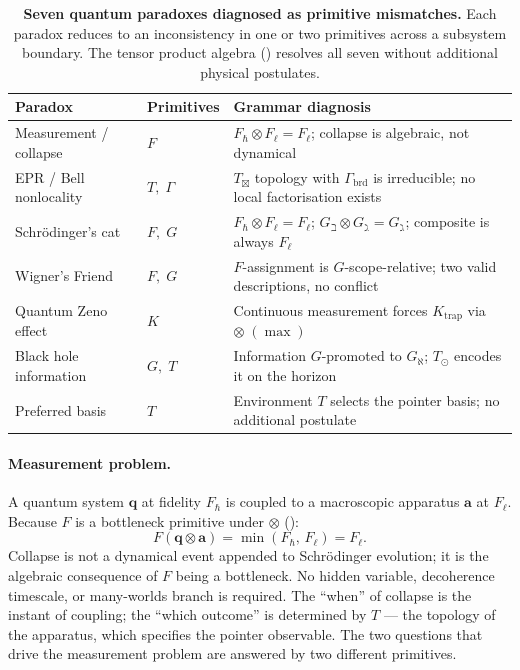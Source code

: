 \documentclass[12pt,a4paper]{article}
\newcommand{\tensor}{\otimes}
\newcommand{\Tbox}{T_{\mathord{\boxtimes}}}
\begin{document}
\begin{table}[H]
\centering
\small
\begin{tabular}{p{3.8cm} l p{5.5cm}}
\toprule
Paradox & Primitives & Grammar diagnosis \\
\midrule
Measurement / collapse & $F$ &
  $F_\hbar \tensor F_\ell = F_\ell$; collapse is algebraic, not dynamical \\[3pt]
EPR / Bell nonlocality & $T,\;\Gamma$ &
  $\Tbox$ topology with $\Gamma_\text{brd}$ is irreducible; no local factorisation exists \\[3pt]
Schrödinger's cat & $F,\; G$ &
  $F_\hbar \tensor F_\ell = F_\ell$; $G_\beth \tensor G_\gimel = G_\gimel$;
  composite is always $F_\ell$ \\[3pt]
Wigner's Friend & $F,\; G$ &
  $F$-assignment is $G$-scope-relative; two valid descriptions, no conflict \\[3pt]
Quantum Zeno effect & $K$ &
  Continuous measurement forces $K_\text{trap}$ via $\tensor\;(\max)$ \\[3pt]
Black hole information & $G,\; T$ &
  Information $G$-promoted to $G_\aleph$; $T_\odot$ encodes it on the horizon \\[3pt]
Preferred basis & $T$ &
  Environment $T$ selects the pointer basis; no additional postulate \\
\bottomrule
\end{tabular}
\caption{\textbf{Seven quantum paradoxes diagnosed as primitive mismatches.}
Each paradox reduces to an inconsistency in one or two primitives across a
subsystem boundary.  The tensor product algebra () resolves
all seven without additional physical postulates.}
\label{tab:quantum_paradoxes}
\end{table}

\paragraph{Measurement problem.}
A quantum system $\mathbf{q}$ at fidelity $F_\hbar$ is coupled to a macroscopic
apparatus $\mathbf{a}$ at $F_\ell$.  Because $F$ is a bottleneck primitive under
$\tensor$ ():
\begin{equation}
  F(\mathbf{q} \tensor \mathbf{a}) = \min(F_\hbar,\, F_\ell) = F_\ell.
  \label{eq:f_collapse}
\end{equation}
Collapse is not a dynamical event appended to Schrödinger evolution; it is the
algebraic consequence of $F$ being a bottleneck.  No hidden variable, decoherence
timescale, or many-worlds branch is required.  The ``when'' of collapse is the
instant of coupling; the ``which outcome'' is determined by $T$ --- the topology
of the apparatus, which specifies the pointer observable.  The two questions that
drive the measurement problem are answered by two different primitives.
\end{document}
